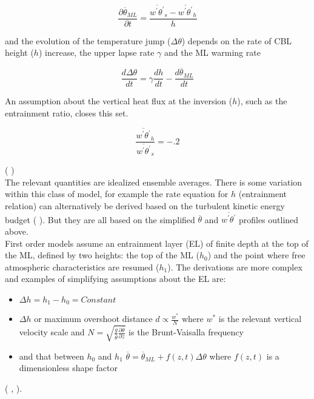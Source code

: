 \begin{equation}
\frac{\partial \overline{\theta}_{ML}}{\partial t} = \frac{\overline{w^{'}\theta^{'}}_{s}-\overline{w^{'}\theta^{'}}_{h}}{h}
\end{equation}

and the evolution of the temperature jump ($\Delta \theta$) depends on the rate of \acs{CBL} height ($h$) increase, 
the upper lapse rate $\gamma$ and the \acs{ML} warming rate
  
\begin{equation}
\frac{d\Delta \theta}{dt} = \gamma\frac{dh}{dt} - \frac{d\overline{\theta}_{ML}}{dt}
\end{equation}

An assumption about the vertical heat flux at the inversion ($h$), such as the entrainment ratio, closes this set.

\begin{equation}
\frac{\overline{w^{'}\theta^{'}}_{h}}{\overline{w^{'}\theta^{'}}_{s}} = -.2
\end{equation}


(\citeauthor{Tennekes73} \cite{Tennekes73})\\

The relevant quantities are idealized ensemble averages. There is some variation within this class of model, for example 
the rate equation for $h$ (entrainment relation) can alternatively be derived based on the turbulent kinetic energy budget 
(\citeauthor{FedConzMir04} \cite{FedConzMir04}).  But they are all based on the simplified $\overline{\theta}$ and 
$\overline{w^{'}\theta^{'}}$ profiles outlined above.\\  

First order models assume an entrainment layer (\acs{EL}) of finite depth at the top of the ML, defined by two heights:
the top of the ML ($h_{0}$) and the point where free atmospheric characteristics are resumed ($h_{1}$).  The derivations are more complex and 
examples of simplifying assumptions about the \acs{EL} are: 
\begin{itemize}
\item{$\Delta h = h_{1} - h_{0} = Constant$
}
\item{$\Delta h$ or maximum 
overshoot distance $d \propto \frac{w^{*}}{N}$ where $w^{*}$ is the relevant vertical velocity scale and $N = \sqrt{\frac{g}{\overline{\theta}} \frac{\partial \overline{\theta}}{\partial z}}$ is the Brunt-Vaisalla frequency}
 \item{and that between $h_{0}$ and $h_{1}$ $\overline{\theta} = \overline{\theta}_{ML} + f(z,t) \Delta \theta$ where $f(z,t)$ is a dimensionless shape factor}
\end{itemize}
 (\citeauthor{Deardorff79} \cite{Deardorff79}, \citeauthor{Stull73} \cite{Stull73}).\\

